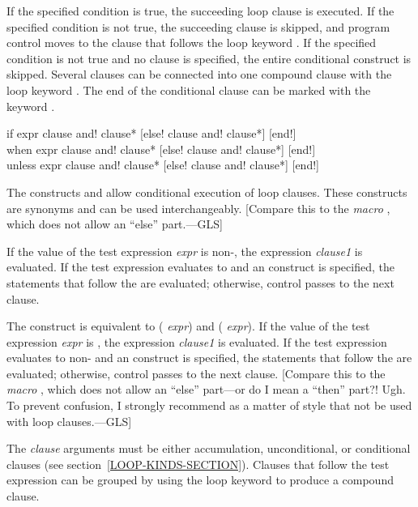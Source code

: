 \begin{new}
If the specified condition is true, the succeeding loop clause
is executed.  If the specified condition is not true, the succeeding clause is
skipped, and program control moves to the clause that follows the loop
keyword .  If the specified condition is not true and no
 clause is specified, the entire conditional construct
is skipped.  Several clauses can be connected into
one compound clause with the loop keyword .
The end of the conditional clause can be marked with the keyword .

\begin{defloop}
if expr clause {\!and! clause}*
   [\!else! clause {\!and! clause}*] [\!end!] \\
when expr clause {\!and! clause}*
     [\!else! clause {\!and! clause}*] [\!end!] \\
unless expr clause {\!and! clause}*
       [\!else! clause {\!and! clause}*] [\!end!]

The constructs  and  allow conditional execution of
loop clauses.  These constructs are synonyms and
can be used interchangeably.  [Compare this to the {\it macro} ,
which does not allow an ``else'' part.---GLS]

If the value of the test expression {\it expr\/} is non-, the expression
{\it clause1\/} is evaluated. If the test expression evaluates to 
and an  construct is specified, the statements that follow the
 are evaluated; otherwise, control passes to the next clause.

The  construct is equivalent to  ( 
{\it expr\/}) and  ( {\it expr\/}).
If the value of the test expression {\it expr\/} is , the expression
{\it clause1\/} is evaluated. If the test expression evaluates to 
non-
and an  construct is specified, the statements that follow the
 are evaluated; otherwise, control passes to the next clause.
[Compare this to the {\it macro} ,
which does not allow an ``else'' part---or do I mean a ``then'' part?!  Ugh.
To prevent confusion, I strongly recommend as a matter of style
that  not be used with  loop clauses.---GLS]

The {\it clause\/} arguments must be either accumulation, unconditional,
or conditional clauses (see section~\ref{LOOP-KINDS-SECTION}).
Clauses that follow the test expression can be grouped by using the 
loop keyword  to produce a compound 
clause.


\end{defloop}
\end{new}
